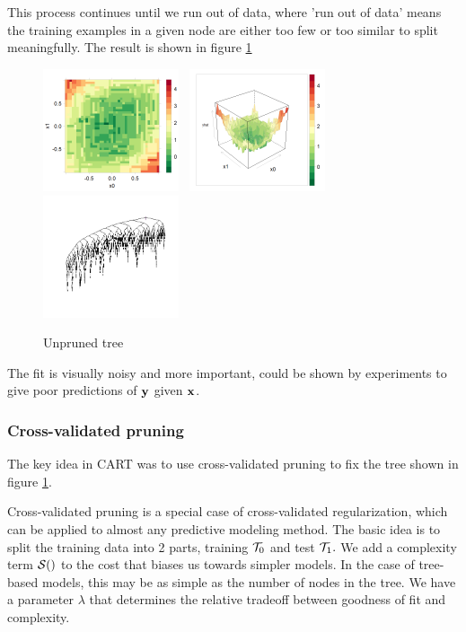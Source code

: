 \documentclass[11pt,openany,american,usenames,dvipsnames,svgnames,x11names,table,isodate]{article}
\numberwithin{equation}{section}
\numberwithin{figure}{section}
\begin{document}
This process continues until we run out of data, where 'run out of
data' means the training examples in a given node are either too few
or too similar to split meaningfully. The result is shown in figure
\ref{fig:unpruned-tree}

\begin{figure}
\noindent \begin{centering}
\includegraphics[width=40mm]{fig/rpart-unpruned-levelplot}~
\includegraphics[width=40mm]{fig/rpart-unpruned-wireframe}~
\includegraphics[width=40mm]{fig/rpart-unpruned-tree}
\par\end{centering}

\protect\caption{\label{fig:unpruned-tree}Unpruned tree}
\end{figure}


The fit is visually noisy and more important, could be shown by experiments
to give poor predictions of ${\mathbf y}$ given ${\mathbf x}$.


\subsubsection{Cross-validated pruning}

The key idea in CART was to use cross-validated pruning to fix the
tree shown in figure \ref{fig:unpruned-tree}.

Cross-validated pruning is a special case of cross-validated regularization,
which can be applied to almost any predictive modeling method. The
basic idea is to split the training data into 2 parts, training $\mathcal{T}_{0}$
and test $\mathcal{T}_{1}.$ We add a complexity term $\mathcal{S}()$ to the
cost that biases us towards simpler models. In the case of tree-based
models, this may be as simple as the number of nodes in the tree.
We have a parameter $\lambda$ that determines the relative tradeoff
between goodness of fit and complexity. 
\end{document}
